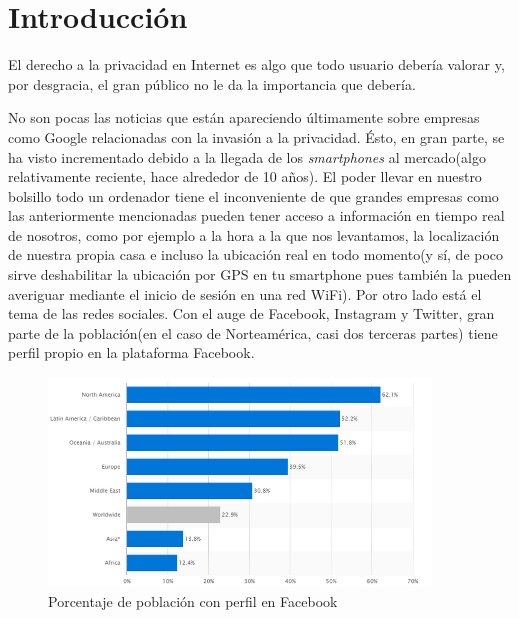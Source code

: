 \chapter{Introducción} 
\label{chap:intro}
\vspace{-0.2cm}


El derecho a la privacidad en Internet es algo que todo usuario
debería valorar y, por desgracia, el gran público no le da la
importancia que debería.

 No son pocas las noticias que están
apareciendo últimamente sobre empresas como Google relacionadas con la
invasión a la privacidad. Ésto, en gran parte, se ha visto
incrementado debido a la llegada de los \textit{smartphones} al
mercado(algo relativamente reciente, hace alrededor de 10 años). El
poder llevar en nuestro bolsillo todo un ordenador tiene el
inconveniente de que grandes empresas como las anteriormente
mencionadas pueden tener acceso a información en tiempo real de
nosotros, como por ejemplo a la hora a la que nos levantamos, la
localización de nuestra propia casa e incluso la ubicación real en
todo momento(y sí, de poco sirve deshabilitar la ubicación por GPS en
tu smartphone pues también la pueden averiguar mediante el inicio de
sesión en una red WiFi).  Por otro lado está el tema de las redes
sociales. Con el auge de Facebook, Instagram y Twitter, gran parte de
la población(en el caso de Norteamérica, casi dos terceras partes)
tiene perfil propio en la plataforma Facebook.

\begin{figure}[h]
	\centerline{
		\mbox{\includegraphics[width=4.00in]{images/sn.png}}
	}
	\caption{Porcentaje de población con perfil en Facebook}
	\label{fig:norm_Daugman}
\end{figure}

